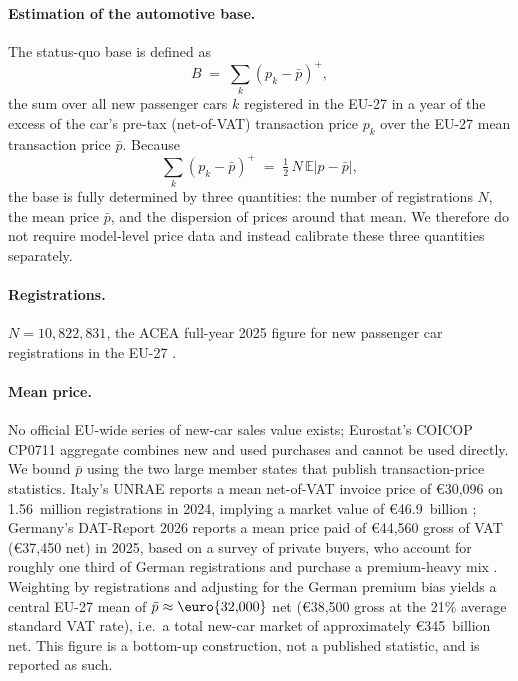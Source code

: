 
\paragraph{Estimation of the automotive base.}
The status-quo base is defined as
\begin{equation}
  B \;=\; \sum_{k} \left(p_k - \bar p\right)^{+},
  \label{eq:auto_base}
\end{equation}
the sum over all new passenger cars $k$ registered in the EU-27 in a year of the excess of the car's pre-tax (net-of-VAT) transaction price $p_k$ over the EU-27 mean transaction price $\bar p$. Because
\begin{equation}
  \sum_{k}\left(p_k - \bar p\right)^{+} \;=\; \tfrac{1}{2}\, N\, \mathbb{E}\lvert p - \bar p\rvert ,
  \label{eq:auto_identity}
\end{equation}
the base is fully determined by three quantities: the number of registrations $N$, the mean price $\bar p$, and the dispersion of prices around that mean. We therefore do not require model-level price data and instead calibrate these three quantities separately.

\paragraph{Registrations.}
$N = 10{,}822{,}831$, the ACEA full-year 2025 figure for new passenger car registrations in the EU-27 \citep{ACEA2026}.

\paragraph{Mean price.}
No official EU-wide series of new-car sales value exists; Eurostat's COICOP CP0711 aggregate combines new and used purchases and cannot be used directly. We bound $\bar p$ using the two large member states that publish transaction-price statistics. Italy's UNRAE reports a mean net-of-VAT invoice price of \euro{30{,}096} on 1.56~million registrations in 2024, implying a market value of \euro{46.9}~billion \citep{UNRAE2025}; Germany's DAT-Report 2026 reports a mean price paid of \euro{44{,}560} gross of VAT (\euro{37{,}450} net) in 2025, based on a survey of private buyers, who account for roughly one third of German registrations and purchase a premium-heavy mix \citep{DAT2026}. Weighting by registrations and adjusting for the German premium bias yields a central EU-27 mean of $\bar p \approx \text{\euro{32{,}000}}$ net (\euro{38{,}500} gross at the 21\% average standard VAT rate), i.e.\ a total new-car market of approximately \euro{345}~billion net. This figure is a bottom-up construction, not a published statistic, and is reported as such.

